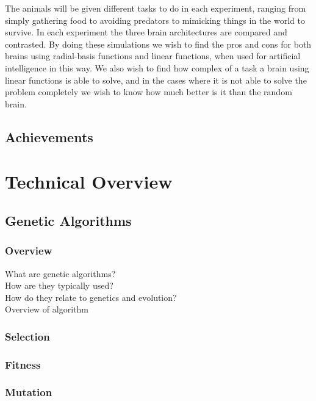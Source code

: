 \documentclass[a4paper,11pt]{kth-mag}
\begin{document}
The animals will be given different tasks to do in each experiment, ranging from simply gathering food to avoiding predators to mimicking things in the world to survive. In each experiment the three brain architectures are compared and contrasted. By doing these simulations we wish to find the pros and cons for both brains using radial-basis functions and linear functions, when used for artificial intelligence in this way. We also wish to find how complex of a task a brain using linear functions is able to solve, and in the cases where it is not able to solve the problem completely we wish to know how much better is it than the random brain.


\section{Achievements}

\chapter{Technical Overview}

\section{Genetic Algorithms}

\subsection{Overview}
What are genetic algorithms?\\
How are they typically used?\\
How do they relate to genetics and evolution?\\
Overview of algorithm\\

\subsection{Selection}
\subsection{Fitness}
\subsection{Mutation}
\end{document}
